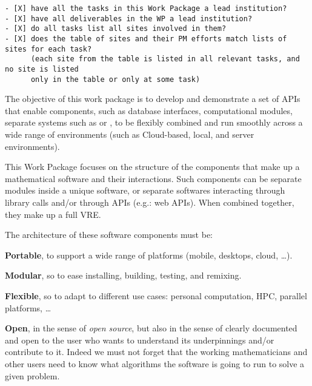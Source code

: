 \begin{draft}
\begin{verbatim}
- [X] have all the tasks in this Work Package a lead institution?
- [X] have all deliverables in the WP a lead institution?
- [X] do all tasks list all sites involved in them?
- [X] does the table of sites and their PM efforts match lists of sites for each task?
      (each site from the table is listed in all relevant tasks, and no site is listed
      only in the table or only at some task)
\end{verbatim}
\end{draft}

\begin{workpackage}[id=component-architecture,wphases=0-48!.5,
  title=Component Architecture,lead=UV,
  PSRM=50,UVRM=8,SARM=16, USORM=6, UORM=4, LLRM=14, UJFRM=6, UGRM=14]

  \begin{wpobjectives}
    The objective of this work package is to develop and demonstrate a
    set of APIs that enable components, such as database interfaces,
    computational modules, separate systems such as \GAP or \Sage, to
    be flexibly combined and run smoothly across a wide range of
    environments (such as Cloud-based, local, and server environments).
  \end{wpobjectives}

  \begin{wpdescription}
    This Work Package focuses on the structure of the components that make
    up a mathematical software and their interactions. Such components
    can be separate modules inside a unique software, or separate
    softwares interacting through library calls and/or through APIs
    (e.g.: web APIs). When combined together, they make up a full VRE.

    The architecture of these software components must be:
    \begin{compactitem}
    \item \textbf{Portable}, to support a wide range of platforms
      (mobile, desktops, cloud, \dots).
    \item \textbf{Modular}, so to ease installing, building, testing,
      and remixing.
    \item \textbf{Flexible}, so to adapt to different use cases:
      personal computation, HPC, parallel platforms, \dots
    \item \textbf{Open}, in the sense of \emph{open source}, but also
      in the sense of clearly documented and open to
      the user who wants to understand its underpinnings and/or
      contribute to it. Indeed we must not forget that the working
      mathematicians and other users need to know what algorithms the software is
      going to run to solve a given problem.
    \end{compactitem}
  \end{wpdescription}


\end{workpackage}

